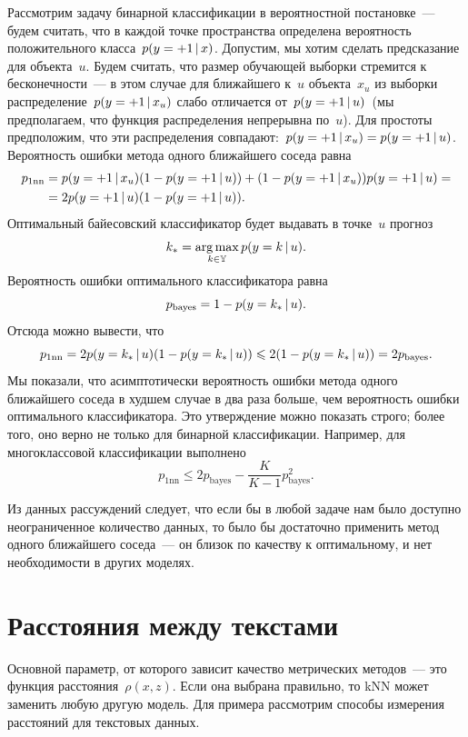 \documentclass[12pt,fleqn]{article}
\begin{document}
Рассмотрим задачу бинарной классификации в вероятностной постановке~---
будем считать, что в каждой точке пространства определена вероятность
положительного класса~$p(y = +1 \mspace{3mu}{|}\mspace{3mu} x)$.
Допустим, мы хотим сделать предсказание для объекта~$u$.
Будем считать, что размер обучающей выборки стремится к бесконечности~---
в этом случае для ближайшего к~$u$ объекта~$x_u$ из выборки
распределение~$p(y = +1 \mspace{3mu}{|}\mspace{3mu} x_u)$ слабо отличается от~$p(y = +1 \mspace{3mu}{|}\mspace{3mu} u)$~(мы предполагаем,
что функция распределения непрерывна по~$u$).
Для простоты предположим, что эти распределения совпадают:~$p(y = +1 \mspace{3mu}{|}\mspace{3mu} x_u) = p(y = +1 \mspace{3mu}{|}\mspace{3mu} u)$.
Вероятность ошибки метода одного ближайшего соседа равна
\begin{align*}
    p_\text{1nn}
    &=
    p(y = +1 \mspace{3mu}{|}\mspace{3mu} x_u) (1 - p(y = +1 \mspace{3mu}{|}\mspace{3mu} u))
    +
    (1 - p(y = +1 \mspace{3mu}{|}\mspace{3mu} x_u)) p(y = +1 \mspace{3mu}{|}\mspace{3mu} u)
    =\\
    &=
    2 p(y = +1 \mspace{3mu}{|}\mspace{3mu} u) (1 - p(y = +1 \mspace{3mu}{|}\mspace{3mu} u)).
\end{align*}
Оптимальный байесовский классификатор будет выдавать в точке~$u$ прогноз
\[
    k_* = \mathop{\rm arg\,max}\limits_{k \in \mathbb{Y}} p(y = k \mspace{3mu}{|}\mspace{3mu} u).
\]
Вероятность ошибки оптимального классификатора равна
\[
    p_\text{bayes}
    =
    1 - p(y = k_* \mspace{3mu}{|}\mspace{3mu} u).
\]
Отсюда можно вывести, что
\[
    p_\text{1nn}
    =
    2 p(y = k_* \mspace{3mu}{|}\mspace{3mu} u) (1 - p(y = k_* \mspace{3mu}{|}\mspace{3mu} u))
    \leqslant
    2 (1 - p(y = k_* \mspace{3mu}{|}\mspace{3mu} u))
    =
    2 p_\text{bayes}.
\]
Мы показали, что асимптотически вероятность ошибки метода одного ближайшего соседа в худшем случае в два раза больше,
чем вероятность ошибки оптимального классификатора.
Это утверждение можно показать строго; более того, оно верно не только для бинарной классификации.
Например, для многоклассовой классификации выполнено
\[
    p_\text{1nn}
    \leq
    2 p_\text{bayes}
    -
    \frac{K}{K - 1}
    p_\text{bayes}^2.
\]

Из данных рассуждений следует, что если бы в любой задаче нам было доступно неограниченное количество данных,
то было бы достаточно применить метод одного ближайшего соседа~--- он близок по качеству к оптимальному,
и нет необходимости в других моделях.

\section{Расстояния между текстами}

Основной параметр, от которого зависит качество метрических методов~--- это функция расстояния~$\rho(x, z)$.
Если она выбрана правильно, то kNN может заменить любую другую модель.
Для примера рассмотрим способы измерения расстояний для текстовых данных.
\end{document}
